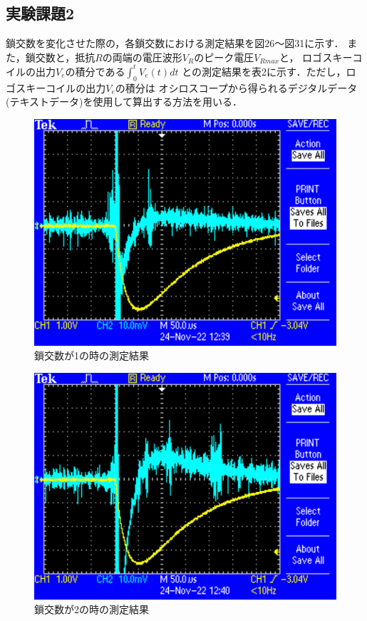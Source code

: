 \newpage

\subsection{実験課題2}
鎖交数を変化させた際の，各鎖交数における測定結果を図26～図31に示す．
また，鎖交数と，抵抗$R$の両端の電圧波形$V_R$のピーク電圧$V_{Rmax}$と，
ロゴスキーコイルの出力$V_e$の積分である$\int_{0}^{t}V_e(t)dt$
との測定結果を表2に示す．ただし，ロゴスキーコイルの出力$V_e$の積分は
オシロスコープから得られるデジタルデータ
(テキストデータ)を使用して算出する方法を用いる．

\begin{figure}[H]
    \centering
    \includegraphics[scale=0.5]{rogowskii-1.pdf}
    \caption{鎖交数が1の時の測定結果}
\end{figure}

\begin{figure}[H]
    \centering
    \includegraphics[scale=0.5]{rogowskii-2.pdf}
    \caption{鎖交数が2の時の測定結果}
\end{figure}

